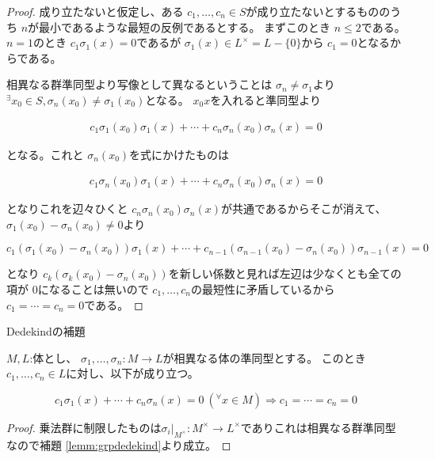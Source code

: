 \documentclass[../master_galois_theory]{subfiles}
\begin{document}
\begin{proof}
  成り立たないと仮定し、ある $c_1 , \dots , c_n \in S$が成り立たないとするもののうち $n$が最小であるような最短の反例であるとする。
  まずこのとき $n \leq 2$である。
  $n = 1$のとき $c_1 \sigma_1 (x) = 0$であるが $\sigma_1 (x) \in L^\times = L - \{ 0 \}$から $c_1 = 0$となるからである。

  相異なる群準同型より写像として異なるということは $\sigma_n \neq \sigma_1$より ${}^\exists x_0 \in S , \sigma_n (x_0) \neq \sigma_1 (x_0)$となる。
  $x_0 x$を入れると準同型より

  \begin{eqnarray}
  c_1 \sigma_1 (x_0) \sigma_1 (x) + \cdots + c_n \sigma_n (x_0) \sigma_n (x) = 0 \label{eq:x_0x}
  \end{eqnarray}

  となる。これと $\sigma_n (x_0)$を式にかけたものは

  \begin{eqnarray}
    c_1 \sigma_n (x_0) \sigma_1 (x) + \cdots + c_n \sigma_n (x_0) \sigma_n (x) = 0 \label{eq:sigmax_0}
  \end{eqnarray}

  となりこれを辺々ひくと $c_n \sigma_n (x_0) \sigma_n (x)$が共通であるからそこが消えて、 $\sigma_1 (x_0) - \sigma_n (x_0) \neq 0$より

  \[
  c_1 ( \sigma_1 (x_0) - \sigma_n (x_0) ) \sigma_1 (x) + \cdots + c_{n-1} ( \sigma_{n-1} (x_0) - \sigma_n (x_0) ) \sigma_{n-1} (x) = 0
  \]

  となり $c_k ( \sigma_k (x_0) - \sigma_n (x_0) )$を新しい係数と見れば左辺は少なくとも全ての項が $0$になることは無いので $c_1 , \dots , c_n$の最短性に矛盾しているから $c_1 = \cdots = c_n = 0$である。

\end{proof}

\begin{lemm} \label{lemm:dedekind}
  \rm{Dedekind}の補題

  $M , L$:体とし、 $\sigma_1 , \dots , \sigma_n : M \longrightarrow L$が相異なる体の準同型とする。
  このとき $c_1 , \dots , c_n \in L$に対し、以下が成り立つ。

  \[
  c_1 \sigma_1 (x) + \cdots + c_n \sigma_n (x) = 0 \  ({}^\forall x \in M)
  \Longrightarrow c_1 = \cdots = c_n = 0
  \]

\end{lemm}

\begin{proof}
  乗法群に制限したものは$\sigma_i |_{M^\times} : M^\times \longrightarrow L^\times$でありこれは相異なる群準同型なので補題 \ref{lemm:grpdedekind}より成立。
\end{proof}
\end{document}
